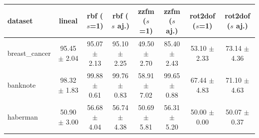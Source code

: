 \begin{tabular}{lccccccc}
\hline
dataset & lineal & rbf ($s$=1) & rbf ($s$ aj.) & zzfm ($s$=1) & zzfm ($s$ aj.) & rot2dof ($s$=1) & rot2dof ($s$ aj.) \\
\hline
breast\_cancer & 95.45 $\pm$ 2.04 & 95.07 $\pm$ 2.13 & 95.10 $\pm$ 2.25 & 49.50 $\pm$ 2.70 & 85.40 $\pm$ 2.43 & 53.10 $\pm$ 2.33 & 73.14 $\pm$ 4.36 \\
banknote & 98.32 $\pm$ 1.83 & 99.88 $\pm$ 0.61 & 99.76 $\pm$ 0.83 & 58.91 $\pm$ 7.02 & 99.65 $\pm$ 0.88 & 67.44 $\pm$ 4.83 & 71.10 $\pm$ 4.63 \\
haberman & 50.90 $\pm$ 3.00 & 56.68 $\pm$ 4.04 & 56.74 $\pm$ 4.38 & 50.69 $\pm$ 5.81 & 56.31 $\pm$ 5.20 & 50.00 $\pm$ 0.00 & 50.07 $\pm$ 0.37 \\
\hline
\end{tabular}
